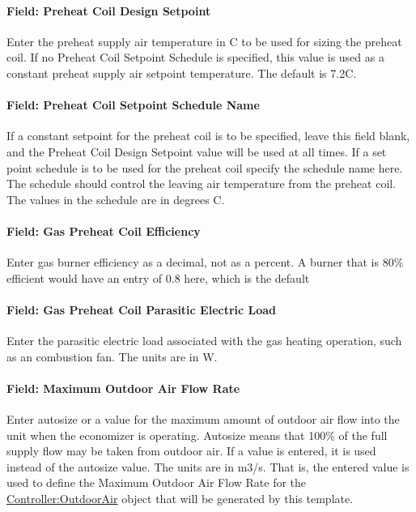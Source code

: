 \paragraph{Field: Preheat Coil Design Setpoint}\label{field-preheat-coil-design-setpoint-2}

Enter the preheat supply air temperature in C to be used for sizing the preheat coil. If no Preheat Coil Setpoint Schedule is specified, this value is used as a constant preheat supply air setpoint temperature. The default is 7.2C.

\paragraph{Field: Preheat Coil Setpoint Schedule Name}\label{field-preheat-coil-setpoint-schedule-name-2}

If a constant setpoint for the preheat coil is to be specified, leave this field blank, and the Preheat Coil Design Setpoint value will be used at all times. If a set point schedule is to be used for the preheat coil specify the schedule name here. The schedule should control the leaving air temperature from the preheat coil. The values in the schedule are in degrees C.

\paragraph{Field: Gas Preheat Coil Efficiency}\label{field-gas-preheat-coil-efficiency-2}

Enter gas burner efficiency as a decimal, not as a percent. A burner that is 80\% efficient would have an entry of 0.8 here, which is the default

\paragraph{Field: Gas Preheat Coil Parasitic Electric Load}\label{field-gas-preheat-coil-parasitic-electric-load-2}

Enter the parasitic electric load associated with the gas heating operation, such as an combustion fan. The units are in W.

\paragraph{Field: Maximum Outdoor Air Flow Rate}\label{field-maximum-outdoor-air-flow-rate-6}

Enter autosize or a value for the maximum amount of outdoor air flow into the unit when the economizer is operating. Autosize means that 100\% of the full supply flow may be taken from outdoor air. If a value is entered, it is used instead of the autosize value. The units are in m3/s. That is, the entered value is used to define the Maximum Outdoor Air Flow Rate for the \hyperref[controlleroutdoorair]{Controller:OutdoorAir} object that will be generated by this template.

